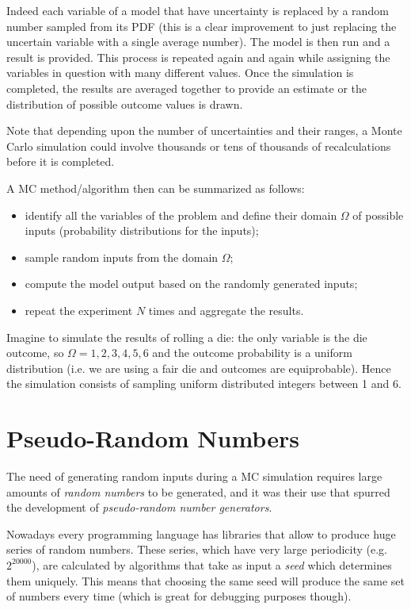 Indeed each variable of a model that have uncertainty is replaced by a random number sampled from its PDF (this is a clear improvement to just replacing the uncertain variable with a single average number).
The model is then run and a result is provided. This process is repeated again and again while assigning the variables in question with many different values. Once the simulation is completed, the results are averaged together to provide an estimate or the distribution of possible outcome values is drawn.

Note that depending upon the number of uncertainties and their ranges, a Monte Carlo simulation could involve thousands or tens of thousands of recalculations before it is completed.

A MC method/algorithm then can be summarized as follows:

\begin{itemize}
\item  identify all the variables of the problem and define their domain $\Omega$ of possible inputs (probability distributions for the inputs);
\item sample random inputs from the domain \(\Omega\);
\item compute the model output based on the randomly generated inputs;
\item repeat the experiment $N$ times and aggregate the results.
\end{itemize}

Imagine to simulate the results of rolling a die: the only variable is the die outcome, so $\Omega =1,2,3,4,5,6$ and the outcome probability is a uniform distribution (i.e. we are using a fair die and outcomes are equiprobable). Hence the simulation consists of sampling uniform distributed integers between 1 and 6.

\section{Pseudo-Random Numbers}
\label{pseudo-random-numbers}

The need of generating random inputs during a MC simulation requires large amounts of \emph{random numbers} to be generated, and it was their use that spurred the development of \emph{pseudo-random number generators}. 

Nowadays every programming language has libraries that allow to produce huge series of random numbers. These series, which have very large periodicity (e.g. \(2^{20000}\)), are calculated by algorithms that take as input a \emph{seed} which determines them uniquely. This means that choosing the same seed will produce the same set of numbers every time (which is great for debugging purposes though).

